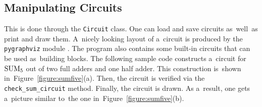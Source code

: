 \subsection{Manipulating Circuits}
This is done through the \texttt{Circuit}
class. One can load and save circuits as~well~as
print and draw them. A~nicely looking layout of
a~circuit is produced by the \texttt{pygraphviz} module \cite{pygraphviz}. The program also contains some built-in
circuits that can be used as~building blocks.
The following sample code constructs a~circuit
for $\operatorname{SUM}_5$ out of two full adders and
one half adder. This construction is~shown
in~Figure~\ref{figure:sumfive}(a). Then,
the circuit is verified via the
\texttt{check_sum_circuit} method.
Finally, the circuit is drawn. As a~result, one gets
a~picture similar to~the one in~Figure~\ref{figure:sumfive}(b).

\inputminted[firstline=40,lastline=47]{python}{../tutorial.py}


